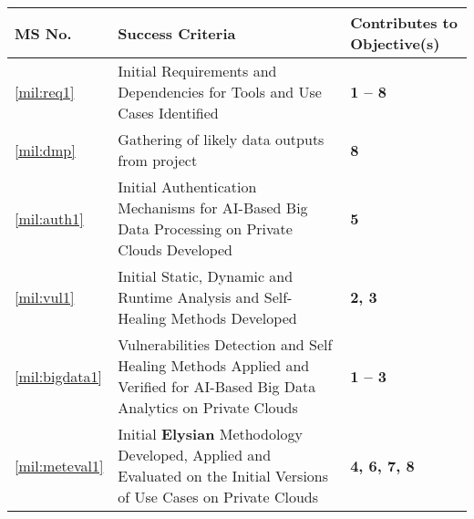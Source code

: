 \documentclass[a4paper,11pt]{article}
\newcommand{\project}[1]{\textbf{#1}\xspace}
\newcommand{\SECURITY}{\project{Elysian}}
\newcommand{\TheProject}{\SECURITY}
\begin{document}
\setcounter{ms}{0}
\vspace{20pt}
\begin{center}
\begin{tabular*}{\textwidth}{|p{1.2cm}|p{13.3cm}|p{2.2cm}|}\hline
\textbf{MS No.} & \textbf{Success Criteria} & \textbf{Contributes to
  Objective(s)} \\
  \hline
\ref{mil:req1} & Initial Requirements and Dependencies for Tools and Use Cases Identified & \textbf{1 -- 8} \\
  \hline
 \ref{mil:dmp} & Gathering of likely data outputs from project & \textbf{ 8} \\
  \hline
\ref{mil:auth1} & Initial Authentication Mechanisms for AI-Based Big Data Processing on Private Clouds Developed & \textbf{5} \\
\hline
\ref{mil:vul1} & Initial Static, Dynamic and Runtime Analysis and Self-Healing Methods Developed & \textbf{2, 3} \\
\hline
\ref{mil:bigdata1} & Vulnerabilities Detection and Self Healing Methods Applied and Verified for AI-Based Big Data Analytics on Private Clouds & \textbf{1 -- 3} \\
\hline
\ref{mil:meteval1} & Initial \TheProject{} Methodology Developed, Applied and Evaluated on the Initial Versions of Use Cases on Private Clouds & \textbf{4, 6, 7, 8} \\


\end{tabular*}
\end{center}
\end{document}
